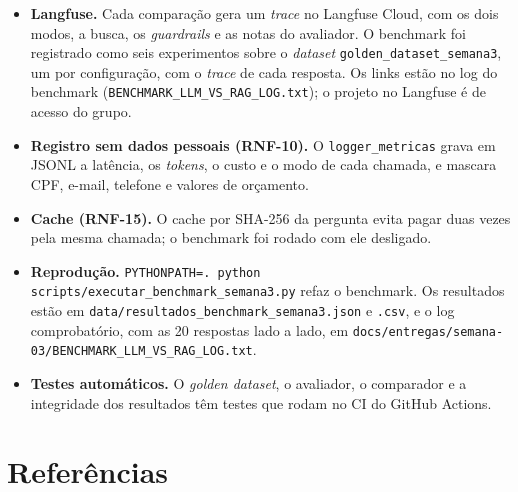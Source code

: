\documentclass[11pt,a4paper]{article}
\newcommand{\codigo}[1]{\texttt{\small #1}}
\begin{document}
\begin{itemize}
\item \textbf{Langfuse.} Cada comparação gera um \textit{trace} no Langfuse Cloud, com os dois modos, a busca, os \textit{guardrails} e as notas do avaliador. O benchmark foi registrado como seis experimentos sobre o \textit{dataset} \codigo{golden\_dataset\_semana3}, um por configuração, com o \textit{trace} de cada resposta. Os links estão no log do benchmark (\codigo{BENCHMARK\_LLM\_VS\_RAG\_LOG.txt}); o projeto no Langfuse é de acesso do grupo.
\item \textbf{Registro sem dados pessoais (RNF-10).} O \codigo{logger\_metricas} grava em JSONL a latência, os \textit{tokens}, o custo e o modo de cada chamada, e mascara CPF, e-mail, telefone e valores de orçamento.
\item \textbf{Cache (RNF-15).} O cache por SHA-256 da pergunta evita pagar duas vezes pela mesma chamada; o benchmark foi rodado com ele desligado.
\item \textbf{Reprodução.} \codigo{PYTHONPATH=. python scripts/executar\_benchmark\_semana3.py} refaz o benchmark. Os resultados estão em \codigo{data/resultados\_benchmark\_semana3.json} e \codigo{.csv}, e o log comprobatório, com as 20 respostas lado a lado, em \codigo{docs/entregas/semana-03/BENCHMARK\_LLM\_VS\_RAG\_LOG.txt}.
\item \textbf{Testes automáticos.} O \textit{golden dataset}, o avaliador, o comparador e a integridade dos resultados têm testes que rodam no CI do GitHub Actions.
\end{itemize}

\begin{center}
\end{center}

\clearpage

\section*{Referências}
\end{document}
